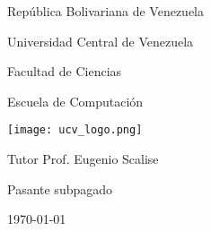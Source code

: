 \begin{titlepage}
	\centering
	{\large República Bolivariana de Venezuela \par}
	{\large Universidad Central de Venezuela\par}
	{\large Facultad de Ciencias\par}
	{\large Escuela de Computación\par}\vspace{2cm}

	\texttt{[image: ucv\_logo.png]}\par\vspace{1cm}
	{\scshape\Large\textbf{\@title}\par}
	\vfill

    {\large Tutor Prof. Eugenio Scalise \par}
    {\large Pasante subpagado \@author \par}
	{\large \mydate\today \par}
\end{titlepage}